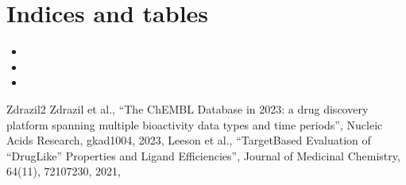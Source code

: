 \documentclass[letterpaper,10pt,english]{sphinxmanual}
\begin{document}
\chapter{Indices and tables}
\label{\detokenize{index:indices-and-tables}}\begin{itemize}
\item {} 
\sphinxAtStartPar
{}

\item {} 
\sphinxAtStartPar
{}

\item {} 
\sphinxAtStartPar
{}

\end{itemize}

\begin{sphinxthebibliography}{Zdrazil2}
\sphinxAtStartPar
Zdrazil et al., “The ChEMBL Database in 2023: a drug discovery platform spanning multiple bioactivity data types and time periods”,
Nucleic Acids Research, gkad1004, 2023, 
\sphinxAtStartPar
Leeson et al., “Target\sphinxhyphen{}Based Evaluation of “Drug\sphinxhyphen{}Like” Properties and Ligand Efficiencies”,
Journal of Medicinal Chemistry, 64(11), 7210\sphinxhyphen{}7230, 2021, 
\end{sphinxthebibliography}
\end{document}
